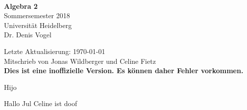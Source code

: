 \documentclass[a4paper, 12pt]{article}
\begin{document}
\begin{titlepage}
	
	\begin{center}
		\ \\ 
		\vspace{4cm}
		{\huge{\bf Algebra 2}}\\
		\vspace{0.8cm}
		{\Large Sommersemester 2018}\\
		\vspace{0.5cm}
		{\Large Universit\"at Heidelberg}
		\\
		\vspace{1cm}
		{\sc Dr. Denis Vogel}
		\vspace{2cm}
		\normalsize{
			\begin{center}
				Letzte Aktualisierung: \today\\
				Mitschrieb von Jonas Wildberger und Celine Fietz\\
				\textbf{Dies ist eine inoffizielle Version. Es können daher Fehler vorkommen.}
			\end{center}
		}
	\end{center}
	
\end{titlepage}
\tableofcontents
Hijo


Hallo Jul
Celine ist doof
\end{document}
